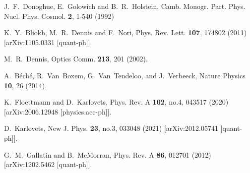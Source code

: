 \documentclass[aps,prd,longbibliography,nofootinbib,amsthm,amsmath,amssymb,amsfonts,notitlepage]{revtex4-1}
\begin{document}
\begin{thebibliography}{99}
J.~F.~Donoghue, E.~Golowich and B.~R.~Holstein,
Camb. Monogr. Part. Phys. Nucl. Phys. Cosmol. \textbf{2}, 1-540 (1992)

K.~Y.~Bliokh, M.~R.~Dennis and F.~Nori,
Phys. Rev. Lett. \textbf{107}, 174802 (2011)
[arXiv:1105.0331 [quant-ph]].



M.~R.~Dennis, 
Optics Comm. {\bf 213}, 201 (2002).



A.~B\'{e}ch\'{e}, R.~Van~Boxem, G.~Van~Tendeloo, and J.~Verbeeck,
Nature Physics {\bf 10}, 26 (2014).

K.~Floettmann and D.~Karlovets,
Phys. Rev. A \textbf{102}, no.4, 043517 (2020)
[arXiv:2006.12948 [physics.acc-ph]].

D.~Karlovets,
New J. Phys. \textbf{23}, no.3, 033048 (2021)
[arXiv:2012.05741 [quant-ph]].

G.~M.~Gallatin and B.~McMorran,
Phys. Rev. A \textbf{86}, 012701 (2012)
[arXiv:1202.5462 [quant-ph]].

\end{thebibliography}
\end{document}
